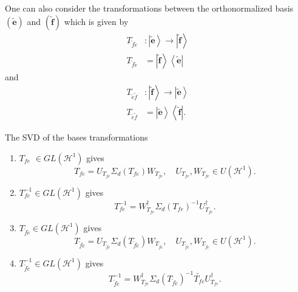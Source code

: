 \documentclass[aps,preprint]{revtex4}%
\begin{document}
One can also consider the transformations between the orthonormalized basis
$\left(  \widetilde{\mathbf{e}}\right)  $ and $\left(  \widetilde{\mathbf{f}%
}\right)  $ which is given by
\begin{align}
T_{\widetilde{f}\widetilde{e}}  &  :\left\vert \widetilde{\mathbf{e}%
}\right\rangle \rightarrow\left\vert \widetilde{\mathbf{f}}\right\rangle \\
T_{\widetilde{f}\widetilde{e}}  &  =\left\vert \widetilde{\mathbf{f}%
}\right\rangle \left\langle \widetilde{\mathbf{e}}\right\vert
\end{align}
and%
\begin{align}
T_{\widetilde{e}\widetilde{f}}  &  :\left\vert \widetilde{\mathbf{f}%
}\right\rangle \rightarrow\left\vert \widetilde{\mathbf{e}}\right\rangle \\
T_{\widetilde{e}\widetilde{f}}  &  =\left\vert \widetilde{\mathbf{e}%
}\right\rangle \left\langle \widetilde{\mathbf{f}}\right\vert .
\end{align}


The SVD of the bases transformations

\begin{enumerate}
\item $T_{fe}$ $\in GL\left(  \mathcal{H}^{1}\right)  $ gives
\begin{equation}
T_{fe}=U_{T_{fe}}\Sigma_{d}\left(  T_{fe}\right)  W_{T_{fe}},\quad U_{T_{fe}%
},W_{T_{fe}}\in U\left(  \mathcal{H}^{1}\right)  .
\end{equation}


\item $T_{fe}^{-1}\in GL\left(  \mathcal{H}^{1}\right)  $ gives
\begin{equation}
T_{fe}^{-1}=W_{T_{fe}}^{\dagger}\Sigma_{d}\left(  T_{fe}\right)
^{-1}U_{T_{fe}}^{\dagger}.
\end{equation}


\item $T_{\widetilde{f}\widetilde{e}}\in GL\left(  \mathcal{H}^{1}\right)  $
gives
\begin{equation}
T_{\widetilde{f}\widetilde{e}}=U_{T_{\widetilde{f}\widetilde{e}}}\Sigma
_{d}\left(  T_{\widetilde{f}\widetilde{e}}\right)  W_{T_{\widetilde{f}%
\widetilde{e}}},\quad U_{T_{\widetilde{f}\widetilde{e}}},W_{T_{\widetilde{f}%
\widetilde{e}}}\in U\left(  \mathcal{H}^{1}\right)  .
\end{equation}


\item $T_{\widetilde{f}\widetilde{e}}^{-1}\in GL\left(  \mathcal{H}%
^{1}\right)  $ gives
\begin{equation}
T_{\widetilde{f}\widetilde{e}}^{-1}=W_{T_{fe}}^{\dagger}\Sigma_{d}\left(
T_{\widetilde{f}\widetilde{e}}\right)  ^{-1}\widetilde{T_{fe}}U_{T_{fe}%
}^{\dagger}.
\end{equation}

\end{enumerate}
\end{document}
